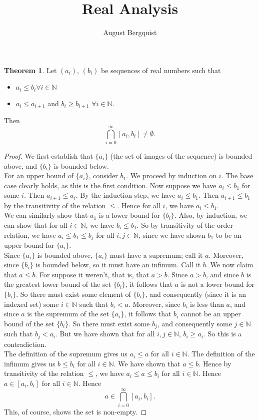 \documentclass[11pt]{article}
\title{Real Analysis}
\author{August Bergquist}
\newcommand{\N}{\mathbb{N}}
\theoremstyle{definition}
\newtheorem{theorem}{Theorem}
\begin{document}
\maketitle

\begin{theorem} Let $(a_i)$, $(b_i)$ be sequences of real numbers such that 
\end{theorem}
\begin{itemize}
\item $a_i \le b_i \forall i\in \N$
\item $a_i \le a_{i+1}$ and $b_i \ge b_{i+1}$ $\forall i \in \N$.
\end{itemize}
Then
$$\bigcap_{i= 0}^{\infty}[a_i,b_i]\ne \emptyset.$$


\begin{proof}
We first establish that $\{a_i\}$ (the set of images of the sequence) is bounded above, and $\{b_i\}$ is bounded below.\\

For an upper bound of $\{a_i\}$, consider $b_1$. We proceed by induction on $i$. The base case clearly holds, as this is the first condition. Now suppose we have $a_i\le b_1$ for some $i$. Then $a_{i+1} \le a_{i}$. By the induction step, we have $a_{i}\le b_1$. Then $a_{i+1}\le b_1$ by the transitivity of the relation $ \le$. Hence for all $i$, we have $a_i\le b_1$.\\

We can similarly show that $a_1$ is a lower bound for $\{b_i\}$. Also, by induction, we can show that for all $i\in \N$, we have $b_i \le b_1$. So by transitivity of the order relation, we have $a_i\le b_1 \le  b_j$ for all $i,j\in \N$, since we have shown $b_1$ to be an upper bound for $\{a_i\}.$  \\

Since $\{a_i\}$ is bounded above, $\{a_i\}$ must have a supremum; call it $a$. Moreover, since $\{b_i\}$ is bounded below, so it must have an infimum. Call it $b$. We now claim that $a\le b$. For suppose it weren't, that is, that $a > b$. Since $a > b$, and since $b$ is the greatest lower bound of the set $\{b_i\}$, it follows that $a$ is not a lower bound for $\{b_i\}$. So there must exist some element of $\{b_i\}$, and consequently (since it is an indexed set) some $i\in \N$ such that $b_i < a$. Moreover, since $b_i$ is less than $a$, and since $a$ is the supremum of the set $ \{a_i\}$, it follows that $b_i$ cannot be an upper bound of the set $\{b_i\}$. So there must exist some $b_j$, and consequently some $j\in \N$ such that $b_j< a_i$. But we have shown that for all $i,j\in \N$, $b_i\ge a_i$. So this is a contradiction. \\

The definition of the supremum gives us $a_i \le a$ for all $i\in \N$. The definition of the infimum gives us $b\le b_i$ for all $i\in \N$. We have shown that $a\le b$. Hence by transitivity of the relation $\le$, we have $a_i\le a\le b_i$ for all $i\in \N$. Hence $a\in [a_i,b_i]$ for all $i\in \N$. Hence 
$$a\in \bigcap_{i = 0}^\infty[a_i,b_i].$$ This, of course, shows the set is non-empty.  
\end{proof}
\end{document}
